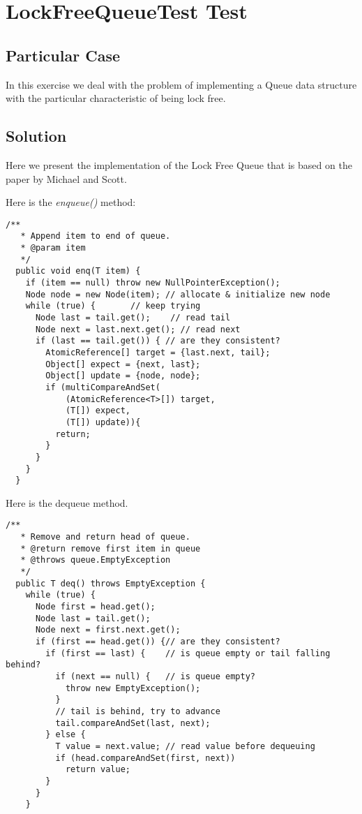 \section{\textbf{LockFreeQueueTest Test}}
\subsection{Particular Case}
\par
In this exercise we deal with the problem of implementing a Queue data
structure with the particular characteristic of being lock free. 
\par
\subsection{Solution}
\par
Here we present the implementation of the Lock Free Queue that is based on the paper by Michael and Scott. 
\par
Here is the \textit{enqueue()} method:
\par
\hfill
\begin{lstlisting}[style=numbers]
  /**
   * Append item to end of queue.
   * @param item
   */
  public void enq(T item) {
    if (item == null) throw new NullPointerException();
    Node node = new Node(item); // allocate & initialize new node
    while (true) {		 // keep trying
      Node last = tail.get();    // read tail
      Node next = last.next.get(); // read next
      if (last == tail.get()) { // are they consistent?
        AtomicReference[] target = {last.next, tail};
        Object[] expect = {next, last};
        Object[] update = {node, node};
        if (multiCompareAndSet(
            (AtomicReference<T>[]) target,
            (T[]) expect,
            (T[]) update)){
          return;
        }
      }
    }
  }
\end{lstlisting}
\hfill
\par
Here is the dequeue method.
\par
\hfill
\begin{lstlisting}[style=numbers]
  /**
   * Remove and return head of queue.
   * @return remove first item in queue
   * @throws queue.EmptyException
   */
  public T deq() throws EmptyException {
    while (true) {
      Node first = head.get();
      Node last = tail.get();
      Node next = first.next.get();
      if (first == head.get()) {// are they consistent?
        if (first == last) {	// is queue empty or tail falling behind?
          if (next == null) {	// is queue empty?
            throw new EmptyException();
          }
          // tail is behind, try to advance
          tail.compareAndSet(last, next);
        } else {
          T value = next.value; // read value before dequeuing
          if (head.compareAndSet(first, next))
            return value;
        }
      }
    }
\end{lstlisting}
\hfill
\par
